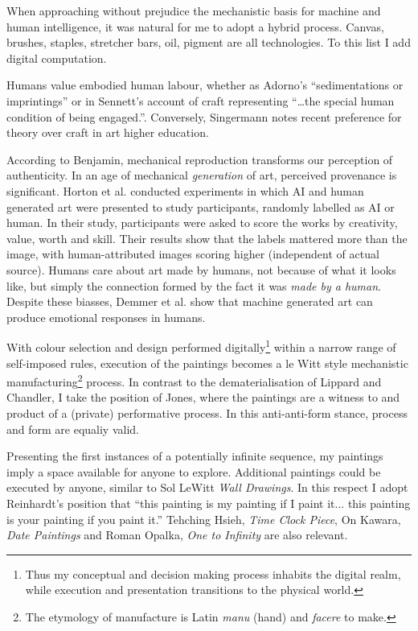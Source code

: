 \documentclass[12pt]{article}
\begin{document}
When approaching without prejudice the mechanistic basis for machine
and human intelligence, it was natural for me to adopt a hybrid
process.  Canvas, brushes, staples, stretcher bars, oil, pigment are
all technologies. To this list I add digital computation.

Humans value embodied human labour, whether as Adorno's
``sedimentations or imprintings''\cite[p. 5]{adorno1970aesthetic} or
in Sennett's account of craft representing ``\dots the special human
condition of being engaged.''\cite[p. 20]{sennett2008craftsman}.
Conversely, Singermann notes recent preference for theory over craft
in art higher education.\cite[p. 23-27]{singerman1999artist}

According to Benjamin, mechanical reproduction transforms our
perception of authenticity.\cite{benjamin1969art} In an age of
mechanical \emph{generation} of art, perceived provenance is
significant. Horton et al. conducted experiments in which AI and human
generated art were presented to study participants, randomly labelled
as AI or human.\cite{horton2023bias} In their study, participants were
asked to score the works by creativity, value, worth and skill. Their
results show that the labels mattered more than the image, with
human-attributed images scoring higher (independent of actual source).
Humans care about art made by humans, not because of what it looks
like, but simply the connection formed by the fact it was \emph{made
  by a human}. Despite these biasses, Demmer et al. show that machine
generated art can produce emotional responses in
humans.\cite{demmer2023does}

With colour selection and design performed digitally\footnote{Thus my
  conceptual and decision making process inhabits the digital realm,
  while execution and presentation transitions to the physical world.}
within a narrow range of self-imposed rules, execution of the
paintings becomes a le Witt style\cite[Sentence
\#28]{LeWitt1969Sentences} mechanistic manufacturing\footnote{The
  etymology of manufacture is Latin \emph{manu} (hand) and
  \emph{facere} to make.} process. In contrast to the
dematerialisation of Lippard and
Chandler\cite{LippardChandler1968Dematerialization,lippard1973sixyears},
I take the position of Jones\cite[pp. 12-13]{Jones1998BodyArt}, where
the paintings are a witness to and product of a (private) performative
process. In this anti-anti-form\cite{Morris1968AntiForm} stance,
process and form are equaliy valid.

Presenting the first instances of a
potentially infinite sequence, my paintings imply a space available
for anyone to explore. Additional paintings could be executed by
anyone, similar to Sol LeWitt \emph{Wall Drawings}. In this respect I
adopt Reinhardt's position that ``this painting is my painting if I
paint it... this painting is your painting if you paint
it.''\cite{abstract-painting-1960} Tehching Hsieh, \emph{Time Clock
  Piece}, On Kawara, \emph{Date Paintings} and Roman Opalka, \emph{One
  to Infinity} are also relevant.
\end{document}
